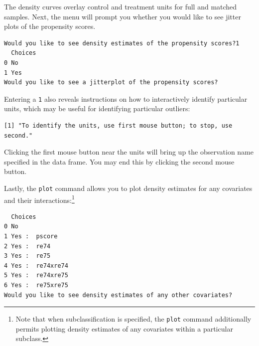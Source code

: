 \documentclass[oneside,letterpaper,titlepage]{article}
\begin{document}
The density curves overlay control and treatment units for full and
matched samples.  Next, the menu will prompt you whether you would
like to see jitter plots of the propensity scores.

\begin{verbatim}
Would you like to see density estimates of the propensity scores?1
  Choices
0 No     
1 Yes    
Would you like to see a jitterplot of the propensity scores?
\end{verbatim}

Entering a \texttt{1} also reveals instructions on how to
interactively identify particular units, which may be useful for
identifying particular outliers: 

\begin{verbatim}
[1] "To identify the units, use first mouse button; to stop, use
second."
\end{verbatim}

Clicking the first mouse button near the units will bring up the
observation name specified in the data frame.  You may end this by
clicking the second mouse button. 

Lastly, the \texttt{plot} command allows you to plot density estimates
for any covariates and their interactions:\footnote{Note that when
  subclassification is specified, the \texttt{plot} command
  additionally permits plotting density estimates of any covariates
  within a particular subclass.}

\begin{verbatim}
  Choices         
0 No              
1 Yes :  pscore   
2 Yes :  re74     
3 Yes :  re75     
4 Yes :  re74xre74
5 Yes :  re74xre75
6 Yes :  re75xre75
Would you like to see density estimates of any other covariates?
\end{verbatim}
\end{document}
